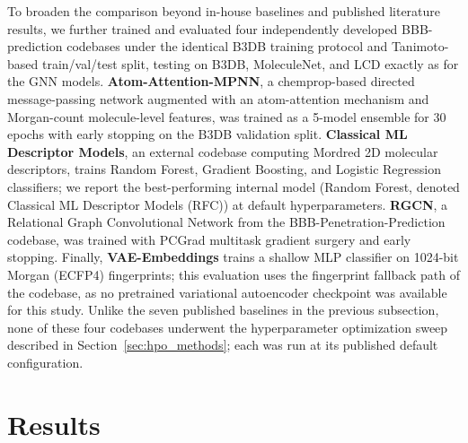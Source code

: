 \documentclass[conference]{IEEEtran}
\begin{document}
To broaden the comparison beyond in-house baselines and published
literature results, we further trained and evaluated four independently
developed BBB-prediction codebases under the identical B3DB training
protocol and Tanimoto-based train/val/test split, testing on B3DB,
MoleculeNet, and LCD exactly as for the GNN models.
\textbf{Atom-Attention-MPNN}, a chemprop-based directed message-passing
network augmented with an atom-attention mechanism and Morgan-count
molecule-level features, was trained as a 5-model ensemble for 30
epochs with early stopping on the B3DB validation split.
\textbf{Classical ML Descriptor Models}, an external codebase computing Mordred 2D
molecular descriptors, trains Random Forest, Gradient Boosting, and
Logistic Regression classifiers; we report the best-performing internal
model (Random Forest, denoted Classical ML Descriptor Models (RFC)) at default
hyperparameters. \textbf{RGCN}, a Relational Graph Convolutional
Network from the BBB-Penetration-Prediction codebase, was trained with
PCGrad multitask gradient surgery and early stopping. Finally,
\textbf{VAE-Embeddings} trains a shallow MLP classifier on 1024-bit
Morgan (ECFP4) fingerprints; this evaluation uses the fingerprint
fallback path of the codebase, as no pretrained variational
autoencoder checkpoint was available for this study. Unlike the seven
published baselines in the previous subsection, none of these four
codebases underwent the hyperparameter optimization sweep described in
Section~\ref{sec:hpo_methods}; each was run at its published default
configuration.

\section{Results}
\end{document}
